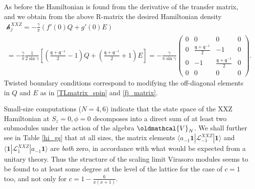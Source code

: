 \documentclass[a4paper,10pt]{article}
\newcommand{\q}{\mathfrak{q}}
\newcommand{\KSgen}{\mathcal{L}}
\begin{document}
As before the Hamiltonian is found from the derivative of the transfer matrix, and we obtain from the above R-matrix the desired Hamiltonian density %
\begin{multline}
{\mathcal h}_j^{XXZ} = -\frac{\gamma}{\pi} ( f'(0)Q + g'(0)E) \\
= -\frac{\gamma}{\pi} \frac{1}{2\sin\gamma} \left[ \left(\frac{\q+\q^{-1}}{2}-1\right)Q + \left(\frac{\q+\q^{-1}}{2}+1\right)E \right] = 
 - \frac{\gamma}{\pi \sin\gamma} 
\begin{pmatrix}
0 & 0 & 0 & 0 \\
0 & \frac{\q+\q^{-1}}{2}  & -1 & 0\\
0 & -1 & \frac{\q+\q^{-1}}{2} & 0\\
0 & 0 & 0 & 0 
\end{pmatrix}.
\end{multline} 
%
Twisted boundary conditions correspond to modifying the off-diagonal elements in $Q$ and $E$ as in \eqref{TLmatrix_spin} and \eqref{fj_matrix}.  %


Small-size computations ($N=4,6$) indicate that the state space of the XXZ Hamiltonian at $S_z=0,\phi=0$ decomposes into a direct sum of at least two submodules under the action of the algebra $\oldmathcal{V}_N$. We shall further see in Table \ref{hi_gs} that at all sizes, the matrix elements $\langle a_{-1} \mathbf{1} | \KSgen^{XXZ}_{-1}|\mathbf{1}\rangle$ and $\langle \mathbf{1} | \KSgen^{XXZ}_{1}|a_{-1} \mathbf{1}\rangle$ are \emph{both} zero, in accordance with what would be expected from a unitary theory. Thus the structure of the scaling limit Virasoro modules seems to be found to at least some degree at the level of the lattice for the case of $c=1$ too, and not only for $c=1-\frac{6}{x(x+1)}$. 


\end{document}
